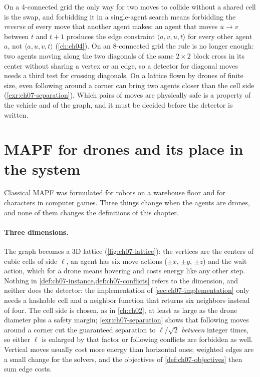 \begin{pitfall}
On a 4-connected grid the only way for two moves to collide without a shared
cell is the swap, and forbidding it in a single-agent search means
forbidding the \emph{reverse} of every move that another agent makes: an
agent that moves $u \to v$ between $t$ and $t+1$ produces the edge
constraint $\langle a, v, u, t\rangle$ for every other agent $a$, not
$\langle a, u, v, t\rangle$ (\cref{ch:ch04}). On an 8-connected grid the
rule is no longer enough: two agents moving along the two diagonals of the
same $2 \times 2$ block cross in its center without sharing a vertex or an
edge, so a detector for diagonal moves needs a third test for crossing
diagonals. On a lattice flown by drones of finite size, even following
around a corner can bring two agents closer than the cell side
(\cref{exr:ch07-separation}). Which pairs of moves are physically safe is a
property of the vehicle and of the graph, and it must be decided before the
detector is written.
\end{pitfall}

\section{MAPF for drones and its place in the system}
\label{sec:ch07-drones}

Classical MAPF was formulated for robots on a warehouse floor and for
characters in computer games. Three things change when the agents are
drones, and none of them changes the definitions of this chapter.

\paragraph{Three dimensions.}
The graph becomes a 3D lattice
(\cref{fig:ch07-lattice}): the vertices are the centers of cubic cells of
side $\ell$, an agent has six move actions ($\pm x$, $\pm y$, $\pm z$) and the wait
action, which for a drone means hovering and costs energy like any other
step. Nothing in \cref{def:ch07-instance,def:ch07-conflicts} refers to
the dimension, and neither does the detector: the implementation of
\cref{sec:ch07-implementation} only needs a hashable cell and a neighbor
function that returns six neighbors instead of four. The cell side is
chosen, as in \cref{ch:ch02}, at least as large as the drone diameter plus a
safety margin; \cref{exr:ch07-separation} shows that following moves around a
corner cut the guaranteed separation to $\ell/\sqrt{2}$ \emph{between}
integer times, so either $\ell$ is enlarged by that factor or following
conflicts are forbidden as well. Vertical moves usually cost more energy than
horizontal ones; weighted edges are a small change for the solvers, and the
objectives of \cref{def:ch07-objectives} then sum edge costs.

